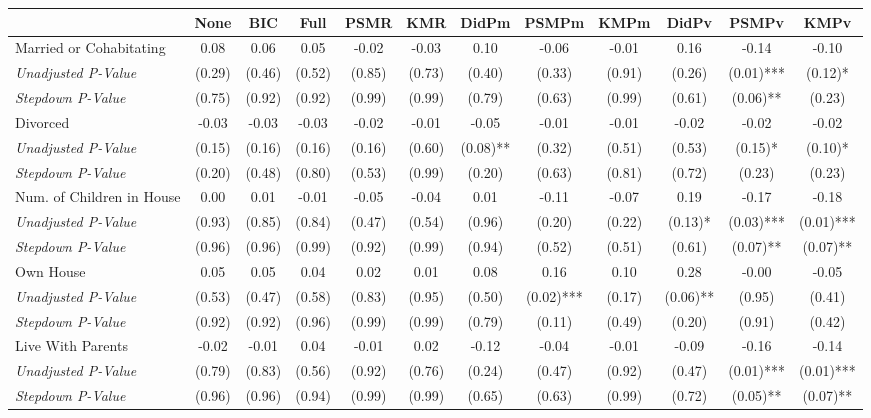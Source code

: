 \begin{tabular}{l c c c c c c c c c c c}
\toprule
 & None & BIC & Full & PSMR & KMR & DidPm & PSMPm & KMPm & DidPv & PSMPv & KMPv \\
\midrule
Married or Cohabitating & 0.08 & 0.06 & 0.05 & -0.02 & -0.03 & 0.10 & -0.06 & -0.01 & 0.16 & -0.14 & -0.10 \\
\quad \textit{Unadjusted P-Value} & (0.29) & (0.46) & (0.52) & (0.85) & (0.73) & (0.40) & (0.33) & (0.91) & (0.26) & (0.01)*** & (0.12)* \\
\quad \textit{Stepdown P-Value} & (0.75) & (0.92) & (0.92) & (0.99) & (0.99) & (0.79) & (0.63) & (0.99) & (0.61) & (0.06)** & (0.23) \\
Divorced & -0.03 & -0.03 & -0.03 & -0.02 & -0.01 & -0.05 & -0.01 & -0.01 & -0.02 & -0.02 & -0.02 \\
\quad \textit{Unadjusted P-Value} & (0.15) & (0.16) & (0.16) & (0.16) & (0.60) & (0.08)** & (0.32) & (0.51) & (0.53) & (0.15)* & (0.10)* \\
\quad \textit{Stepdown P-Value} & (0.20) & (0.48) & (0.80) & (0.53) & (0.99) & (0.20) & (0.63) & (0.81) & (0.72) & (0.23) & (0.23) \\
Num. of Children in House & 0.00 & 0.01 & -0.01 & -0.05 & -0.04 & 0.01 & -0.11 & -0.07 & 0.19 & -0.17 & -0.18 \\
\quad \textit{Unadjusted P-Value} & (0.93) & (0.85) & (0.84) & (0.47) & (0.54) & (0.96) & (0.20) & (0.22) & (0.13)* & (0.03)*** & (0.01)*** \\
\quad \textit{Stepdown P-Value} & (0.96) & (0.96) & (0.99) & (0.92) & (0.99) & (0.94) & (0.52) & (0.51) & (0.61) & (0.07)** & (0.07)** \\
Own House & 0.05 & 0.05 & 0.04 & 0.02 & 0.01 & 0.08 & 0.16 & 0.10 & 0.28 & -0.00 & -0.05 \\
\quad \textit{Unadjusted P-Value} & (0.53) & (0.47) & (0.58) & (0.83) & (0.95) & (0.50) & (0.02)*** & (0.17) & (0.06)** & (0.95) & (0.41) \\
\quad \textit{Stepdown P-Value} & (0.92) & (0.92) & (0.96) & (0.99) & (0.99) & (0.79) & (0.11) & (0.49) & (0.20) & (0.91) & (0.42) \\
Live With Parents & -0.02 & -0.01 & 0.04 & -0.01 & 0.02 & -0.12 & -0.04 & -0.01 & -0.09 & -0.16 & -0.14 \\
\quad \textit{Unadjusted P-Value} & (0.79) & (0.83) & (0.56) & (0.92) & (0.76) & (0.24) & (0.47) & (0.92) & (0.47) & (0.01)*** & (0.01)*** \\
\quad \textit{Stepdown P-Value} & (0.96) & (0.96) & (0.94) & (0.99) & (0.99) & (0.65) & (0.63) & (0.99) & (0.72) & (0.05)** & (0.07)** \\
\bottomrule
\end{tabular}
